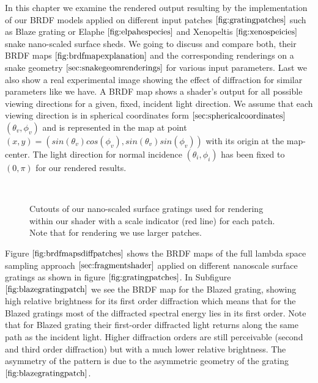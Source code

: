 In this chapter we examine the rendered output resulting by the implementation of our BRDF models applied on different input patches $\ref{fig:gratingpatches}$ such as Blaze grating or Elaphe $\ref{fig:elpahespecies}$ and Xenopeltis $\ref{fig:xenospeicies}$ snake nano-scaled surface sheds. We going to discuss and compare both, their BRDF maps $\ref{fig:brdfmapexplanation}$ and the corresponding renderings on a snake geometry $\ref{sec:snakegeomrenderings}$ for various input parameters. Last we also show a real experimental image showing the effect of diffraction for similar parameters like we have. 
A BRDF map shows a shader's output for all possible viewing directions for a given, fixed, incident light direction. We assume that each viewing direction is in spherical coordinates form $\ref{sec:sphericalcoordinates}$ $(\theta_v, \phi_v)$ and is represented in the map at point $(x,y) = (sin(\theta_v)cos(\phi_v), sin(\theta_v)sin(\phi_v))$ with its origin at the map-center. The light direction for normal incidence $(\theta_i, \phi_i)$ has been fixed to $(0,\pi)$ for our rendered results.

\begin{figure}[H]
  \centering
~
~

\caption{Cutouts of our nano-scaled surface gratings used for rendering within our shader with a scale indicator (red line) for each patch. Note that for rendering we use larger patches.}
\label{fig:gratingpatches}
\end{figure}

Figure $\ref{fig:brdfmapsdiffpatches}$ shows the BRDF maps of the full lambda space sampling approach $\ref{sec:fragmentshader}$ applied on different nanoscale surface gratings as shown in figure $\ref{fig:gratingpatches}$. In Subfigure $\ref{fig:blazegratingpatch}$ we see the BRDF map for the Blazed grating, showing high relative brightness for its first order diffraction which means that for the Blazed gratings most of the diffracted spectral energy lies in its first order. Note that for Blazed grating their first-order diffracted light returns along the same path as the incident light. Higher diffraction orders are still perceivable (second and third order diffraction) but with a much lower relative brightness. The asymmetry of the pattern is due to the asymmetric geometry of the grating $\ref{fig:blazegratingpatch}$.


